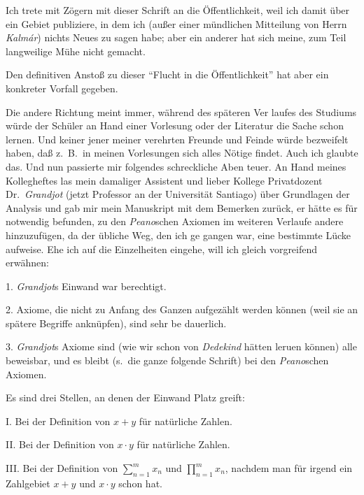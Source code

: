 Ich trete mit Z\"ogern mit dieser Schrift an die \"Offentlichkeit,
weil ich damit \"uber ein Gebiet publiziere, in dem ich (au{\ss}er einer
m\"undlichen Mitteilung von Herrn {\sl Kalm\'ar\/}) nichts Neues zu sagen
habe; aber ein anderer hat sich meine, zum Teil langweilige M\"uhe
nicht gemacht.

Den definitiven Ansto{\ss} zu dieser ``Flucht in die \"Offentlichkeit''
hat aber ein konkreter Vorfall gegeben.

Die andere Richtung meint immer, w\"ahrend des sp\"ateren Ver%
laufes des Studiums w\"urde der Sch\"uler an Hand einer Vorlesung
oder der Literatur die Sache schon lernen.  Und keiner jener
meiner verehrten Freunde und Feinde w\"urde bezweifelt haben, da{\ss}
z.~B.\ in meinen Vorlesungen sich alles N\"otige findet.  Auch ich
glaubte das.  Und nun passierte mir folgendes schreckliche Aben%
teuer.  An Hand meines Kollegheftes las mein damaliger Assistent
und lieber Kollege Privatdozent Dr.~{\sl Grandjot\/} (jetzt Professor
an der Universit\"at Santiago) \"uber Grundlagen der Analysis und
gab mir mein Manuskript mit dem Bemerken zur\"uck, er h\"atte es
f\"ur notwendig befunden, zu den {\sl Peano\/}schen Axiomen im weiteren
Verlaufe andere hinzuzuf\"ugen, da der \"ubliche Weg, den ich ge%
gangen war, eine bestimmte L\"ucke aufweise.  Ehe ich auf die
Einzelheiten eingehe, will ich gleich vorgreifend erw\"ahnen:

1. {\sl Grandjot\/}s Einwand war berechtigt.

2. Axiome, die nicht zu Anfang des Ganzen aufgez\"ahlt werden
k\"onnen (weil sie an sp\"atere Begriffe ankn\"upfen), sind sehr be%
dauerlich.

3. {\sl Grandjot\/}s Axiome sind (wie wir schon von {\sl Dedekind\/}
h\"atten leruen k\"onnen) alle beweisbar, und es bleibt (s.\ die ganze
folgende Schrift) bei den {\sl Peano\/}schen Axiomen.

Es sind drei Stellen, an denen der Einwand Platz greift:

I. Bei der Definition von $x + y$ f\"ur nat\"urliche Zahlen.

II. Bei der Definition von $x \cdot y$ f\"ur nat\"urliche Zahlen.

III. Bei der Definition von $\sum_{n = 1}^m x_n$ und $\prod_{n = 1}^m x_n$, nachdem man
f\"ur irgend ein Zahlgebiet $x + y$ und $x \cdot y$ schon hat.

